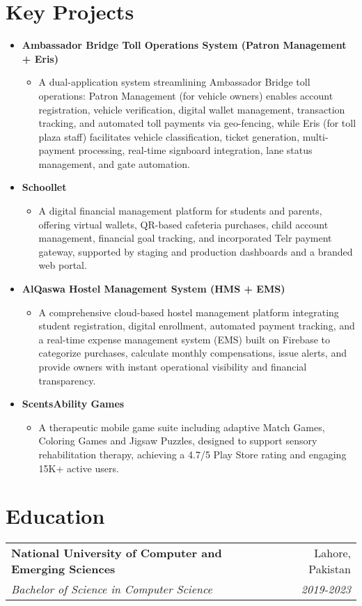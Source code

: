 \documentclass[a4paper,10pt]{article}
\makeatletter
\newcommand{\resumeSubheading}[4]{
  \item
  \begin{tabular*}{\textwidth}[t]{l@{\extracolsep{\fill}}r}
    \textbf{#1} & #2 \\
    \textit{\small#3} & \textit{\small#4} \\
  \end{tabular*}
}
\newcommand{\resumeProject}[2]{%
  \item[]\small{%
    \textbf{#1}\\[-0.2em]%
    \begin{itemize}[leftmargin=*, label={\textbullet}, topsep=3pt, partopsep=3pt]
      \item #2
    \end{itemize}%
  }%
}
\makeatother
\begin{document}
\section{Key Projects}
\begin{itemize}[leftmargin=*]

  \resumeProject{Ambassador Bridge Toll Operations System (Patron Management + Eris)}
    {A dual-application system streamlining Ambassador Bridge toll operations: Patron Management (for vehicle owners) enables account registration, vehicle verification, digital wallet management, transaction tracking, and automated toll payments via geo-fencing, while Eris (for toll plaza staff) facilitates vehicle classification, ticket generation, multi-payment processing, real-time signboard integration, lane status management, and gate automation.}


  \resumeProject{Schoollet}
  {A digital financial management platform for students and parents, offering virtual wallets, QR-based cafeteria purchases, child account management, financial goal tracking, and incorporated Telr payment gateway, supported by staging and production dashboards and a branded web portal.}

  \resumeProject{AlQaswa Hostel Management System (HMS + EMS)}
    {A comprehensive cloud-based hostel management platform integrating student registration, digital enrollment, automated payment tracking, and a real-time expense management system (EMS) built on Firebase to categorize purchases, calculate monthly compensations, issue alerts, and provide owners with instant operational visibility and financial transparency.}


  \resumeProject{ScentsAbility Games}
  {A therapeutic mobile game suite including adaptive Match Games, Coloring Games and Jigsaw Puzzles, designed to support sensory rehabilitation therapy, achieving a 4.7/5 Play Store rating and engaging 15K+ active users.}

\end{itemize}


\section{Education}
\resumeSubheading {National University of Computer and Emerging Sciences}{Lahore, Pakistan}
{Bachelor of Science in Computer Science} {2019-2023}
\end{document}
